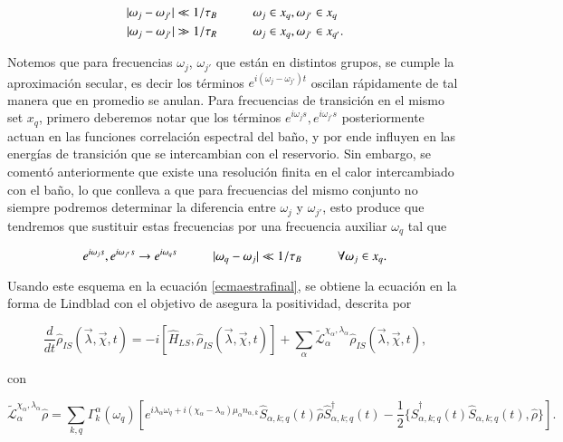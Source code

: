 \begin{align*}
    |\omega_{j}-\omega_{j'}| \ll 1/\tau_{B}  &\hspace{10mm} \omega_{j} \in x_{q}, \omega_{j'} \in x_{q} \\
    |\omega_{j}-\omega_{j'}| \gg 1/\tau_{R}  &\hspace{10mm} \omega_{j} \in x_{q}, \omega_{j'} \in x_{q'}.
\end{align*}

Notemos que para frecuencias $\omega_{j}$, $\omega_{j'}$ que están en distintos grupos, se cumple la aproximación secular, es decir los términos $e^{i(\omega_{j} - \omega_{j'})t}$ oscilan rápidamente de tal manera que en promedio se anulan. Para frecuencias de transición en el mismo set $x_{q}$, primero deberemos notar que los términos $e^{i\omega_{j}s},e^{i\omega_{j'}s}$ posteriormente actuan en las funciones correlación espectral del baño, y por ende influyen en las energías de transición que se intercambian con el reservorio. Sin embargo, se comentó anteriormente que existe una resolución finita en el calor intercambiado con el baño, lo que conlleva a que para frecuencias del mismo conjunto no siempre podremos determinar la diferencia entre $\omega_{j}$ y $\omega_{j'}$, esto produce que tendremos que sustituir estas frecuencias por una frecuencia auxiliar $\omega_{q}$ tal que

\begin{equation*}
    e^{i\omega_{j}s},e^{i\omega_{j'}s} \to e^{i\omega_{q}s} \hspace{10mm} |\omega_{q} - \omega_{j}| \ll 1/\tau_{B} \hspace{10mm} \forall \omega_{j} \in x_{q}.
\end{equation*}

Usando este esquema en la ecuación \ref{ecmaestrafinal}, se obtiene la ecuación en la forma de Lindblad con el objetivo de asegura la positividad\cite{chruscinski2017brief}, descrita por

\begin{equation*}
    \frac{d}{dt}\hat{\rho}_{IS}(\vec{\lambda},\vec{\chi},t) = -i[\hat{H}_{LS},\hat{\rho}_{IS}(\vec{\lambda},\vec{\chi},t)] + \sum_{\alpha}\tilde{\mathcal{L}}^{\chi_{\alpha},\lambda_{\alpha}}_{\alpha} \hat{\rho}_{IS}(\vec{\lambda},\vec{\chi},t),
\end{equation*}

con

\begin{equation*}
    \tilde{\mathcal{L}}^{\chi_{\alpha},\lambda_{\alpha}}_{\alpha}\hat{\rho} = \sum_{k,q}\Gamma^{\alpha}_{k}(\omega_{q}) \left[e^{i\lambda_{\alpha}\omega_{q} + i(\chi_{\alpha}-\lambda_{\alpha})\mu_{\alpha}n_{\alpha,k}}\hat{S}_{\alpha,k;q}(t)\hat{\rho}\hat{S}^{\dagger}_{\alpha,k;q}(t) - \frac{1}{2}\{\hat{S}^{\dagger}_{\alpha,k;q}(t)\hat{S}_{\alpha,k;q}(t),\hat{\rho} \} \right].
\end{equation*}

